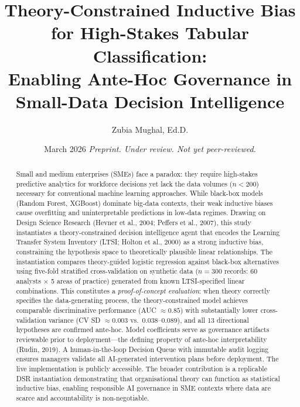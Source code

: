 \documentclass[11pt,a4paper]{article}
\begin{document}
\title{\textbf{Theory-Constrained Inductive Bias for High-Stakes Tabular Classification:\\
Enabling Ante-Hoc Governance in Small-Data Decision Intelligence}}

\author[1]{Zubia Mughal, Ed.D.}
\date{March 2026 \quad \textit{Preprint. Under review. Not yet peer-reviewed.}}

\maketitle
\thispagestyle{fancy}

\begin{abstract}
\noindent
Small and medium enterprises (SMEs) face a paradox: they require high-stakes predictive analytics for workforce decisions yet lack the data volumes ($n < 200$) necessary for conventional machine learning approaches. While black-box models (Random Forest, XGBoost) dominate big-data contexts, their weak inductive biases cause overfitting and uninterpretable predictions in low-data regimes. Drawing on Design Science Research (Hevner et al., 2004; Peffers et al., 2007), this study instantiates a theory-constrained decision intelligence agent that encodes the Learning Transfer System Inventory (LTSI; Holton et al., 2000) as a strong inductive bias, constraining the hypothesis space to theoretically plausible linear relationships. The instantiation compares theory-guided logistic regression against black-box alternatives using five-fold stratified cross-validation on synthetic data ($n = 300$ records: 60 analysts $\times$ 5 areas of practice) generated from known LTSI-specified linear combinations. This constitutes a \emph{proof-of-concept evaluation}: when theory correctly specifies the data-generating process, the theory-constrained model achieves comparable discriminative performance (AUC $\approx 0.85$) with substantially lower cross-validation variance (CV SD $\approx 0.003$ vs.\ $0.038$--$0.089$), and all 13 directional hypotheses are confirmed ante-hoc. Model coefficients serve as governance artifacts reviewable prior to deployment---the defining property of ante-hoc interpretability (Rudin, 2019). A human-in-the-loop Decision Queue with immutable audit logging ensures managers validate all AI-generated intervention plans before deployment. The live implementation is publicly accessible. The broader contribution is a replicable DSR instantiation demonstrating that organisational theory can function as statistical inductive bias, enabling responsible AI governance in SME contexts where data are scarce and accountability is non-negotiable.
\end{abstract}
\end{document}
